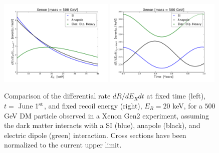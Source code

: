 \documentclass[11pt]{article}
\begin{document}
\begin{figure}
\centering
\includegraphics[width=0.49\textwidth, trim=1.cm 0.0cm 0.7cm 0.4cm,clip=true]{plots/RecoilComparison.pdf}
\includegraphics[width=0.49\textwidth, trim=0.7cm 0.0cm 1.cm 0.4cm,clip=true]{plots/TimeComparison.pdf}
\caption{\label{fig:diff_rate_comp}
Comparison of the differential rate $dR/dE_{R}dt$ at fixed time (left), $t =$ June $1^{\rm st}$, and fixed recoil energy (right), $E_R = 20$ keV, for a $500$ GeV DM particle observed in a Xenon Gen2 experiment, assuming the dark matter interacts with a SI (blue), anapole (black), and electric dipole (green) interaction. Cross sections have been normalized to the current upper limit.}
\end{figure}
\end{document}
